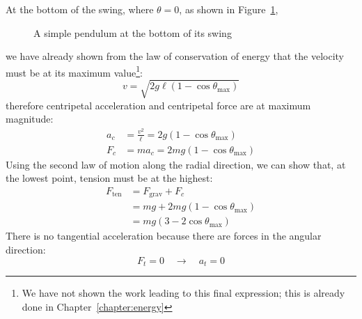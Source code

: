 At the bottom of the swing, where $\theta=0$, as shown in
Figure~\ref{fig:bottom-swing},
\begin{figure}[t]
  \centering
  \caption{A simple pendulum at the bottom of its swing}
  \label{fig:bottom-swing}
\end{figure}
we have already shown from the law of conservation of energy that the velocity
must be at its maximum value\footnote{We have not shown the work leading to
this final expression; this is already done in Chapter~\ref{chapter:energy}}:
\begin{equation}
  v=\sqrt{2g\ell(1-\cos\theta_\text{max})}
\end{equation}
therefore centripetal acceleration and centripetal force are at maximum
magnitude:
\begin{align*}
  a_c &=\frac{v^2}\ell=2g(1-\cos\theta_\text{max})\\
  F_c &= ma_c=2mg(1-\cos\theta_\text{max})
\end{align*}
Using the second law of motion along the radial direction, we can show that, at
the lowest point, tension must be at the highest:
\begin{align*}
  F_\text{ten} &= F_\text{grav}+F_c\\
  &= mg+2mg(1-\cos\theta_\text{max})\\
  &= mg(3-2\cos\theta_\text{max})
\end{align*}
There is no tangential acceleration because there are forces in the angular
direction:
\begin{equation*}
  F_t=0\quad\longrightarrow\quad a_t=0
\end{equation*}



